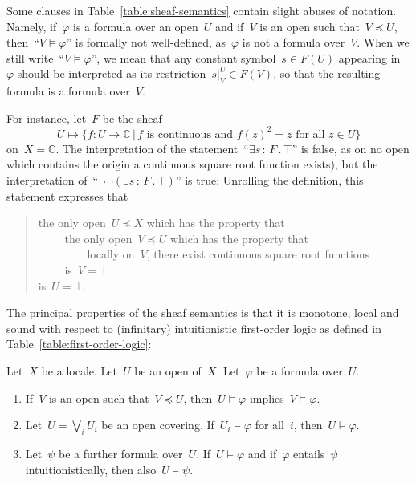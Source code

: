 \documentclass{ws-rv9x6}
\newcommand{\CC}{\mathbb{C}}
\renewcommand{\_}{\mathpunct{.}}
\newcommand{\?}{\,{:}\,}
\begin{document}
Some clauses in Table~\ref{table:sheaf-semantics} contain slight abuses of
notation. Namely, if~$\varphi$ is a formula over an open~$U$ and if~$V$ is an
open such that~$V \preceq U$, then~``$V \models \varphi$'' is formally not
well-defined, as~$\varphi$ is not a formula over~$V$. When we still write~``$V
\models \varphi$'', we mean that any constant symbol~$s \in F(U)$ appearing
in~$\varphi$ should be interpreted as its restriction~$s|^U_V \in F(V)$, so
that the resulting formula is a formula over~$V$.

\begin{example}\label{ex:negneg}
For instance, let~$F$ be the sheaf
\[ U \longmapsto \{ f : U \to \CC \,|\, \text{$f$ is continuous and~$f(z)^2 =
z$ for all~$z \in U$} \} \]
on~$X = \CC$. The interpretation of the statement~``$\exists s\?F\_ \top$'' is
false, as on no open which contains the origin a continuous square root
function exists), but the interpretation of~``$\neg\neg(\exists s\?F\_ \top)$''
is true: Unrolling the definition, this statement expresses that
\begin{quote}
the only open~$U \preceq X$ which has the property that \\
${\qquad}$ the only open~$V \preceq U$ which has the property that \\
${\qquad\qquad}$ locally on~$V$, there exist continuous square root functions \\
${\qquad}$ is~$V = \bot$ \\
is~$U = \bot$.
\end{quote}
\end{example}


The principal properties of the sheaf semantics is that it is monotone, local
and sound with respect to (infinitary) intuitionistic first-order logic as
defined in Table~\ref{table:first-order-logic}:

\begin{theorem}\label{thm:basic-properties-sheaf-semantics}
Let~$X$ be a locale. Let~$U$ be an open of~$X$. Let~$\varphi$ be
a formula over~$U$.
\begin{enumerate}
\item If~$V$ is an open such that~$V \preceq U$, then~$U \models
\varphi$ implies~$V \models \varphi$.
\item Let~$U = \bigvee_i U_i$ be an open covering. If~$U_i \models
\varphi$ for all~$i$, then~$U \models \varphi$.
\item Let~$\psi$ be a further formula over~$U$. If~$U \models
\varphi$ and if~$\varphi$ entails~$\psi$ intuitionistically, then also~$U
\models \psi$.
\end{enumerate}
\end{theorem}
\end{document}
